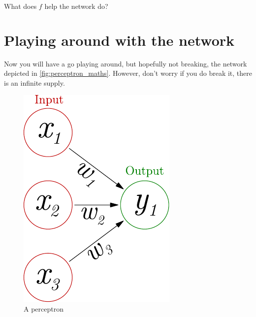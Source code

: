 \documentclass[a4paper,10pt]{article}
\begin{document}
What does $f$ help the network do?


\section{Playing around with the network}
Now you will have a go playing around, but hopefully not breaking, the network depicted in \autoref{fig:perceptron_maths}. However, don't worry if you do break it, there is an infinite supply.

\begin{figure}[hb]
\centering
\includegraphics{../slides/fig/perceptron_maths.pdf}
\caption{A perceptron}
\label{fig:perceptron_maths}
\end{figure}
\end{document}

